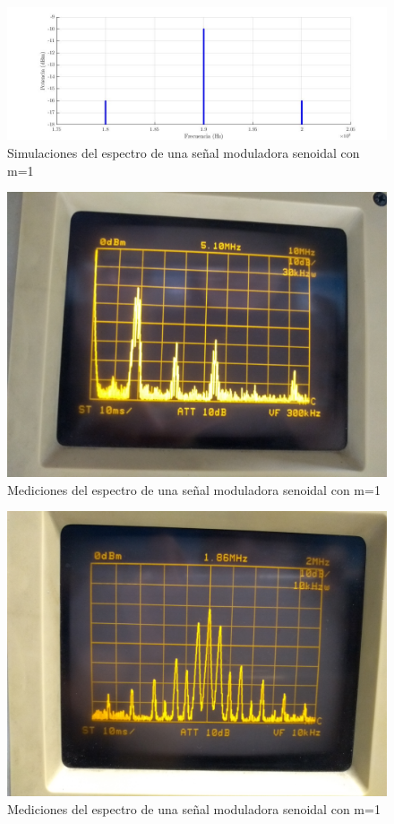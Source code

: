 \documentclass[../../labo_tp5_main.tex]{subfiles}
\begin{document}
\begin{figure}[H]	
	\centering
	\includegraphics[scale=0.5]{imagenes/labo_tp5_ej3b.jpg}
	\caption{Simulaciones del espectro de una señal moduladora senoidal con m=1}
	\label{fig:ej1_labo_tp5_ej3_b}
\end{figure}
\begin{figure}[H]	
	\centering
	\includegraphics[scale=0.05]{imagenes/labo_tp5_ej3_b_2.jpg}
	\caption{Mediciones del espectro de una señal moduladora senoidal con m=1}
	\label{fig:ej1_labo_tp5_ej3_b_2}
\end{figure}
\begin{figure}[H]	
	\centering
	\includegraphics[scale=0.05]{imagenes/labo_tp5_ej3_c_1.jpg}
	\caption{Mediciones del espectro de una señal moduladora senoidal con m=1}
	\label{fig:ej1_labo_tp5_ej3_c_1}
\end{figure}
\end{document}
